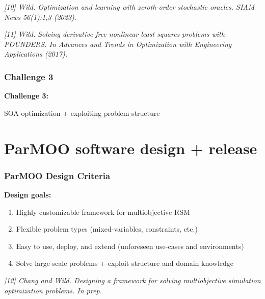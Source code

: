 \documentclass[aspectratio=169]{beamer}
\begin{document}
\begin{frame}
\medskip

{\tiny\it
[10] Wild. Optimization and learning with zeroth-order stochastic oracles.
{\sl SIAM News 56(1):1,3 (2023).}\\
}

\medskip

{\tiny\it
[11] Wild.
Solving derivative-free nonlinear least squares problems with POUNDERS.
{\sl In Advances and Trends in Optimization with Engineering Applications
(2017).}\\
}
\end{frame}

\begin{frame}\frametitle{Challenge 3}
\vfill
\begin{center}
{\Huge \bf
Challenge 3:\\

\bigskip

SOA optimization + exploiting problem structure
}
\end{center}
\vfill
\end{frame}

\section{ParMOO software design + release}

\begin{frame}\frametitle{ParMOO Design Criteria}

{\large
\textbf{Design goals:}}

\medskip

\begin{enumerate}
\item Highly customizable framework for multiobjective RSM
\item Flexible problem types (mixed-variables, constraints, etc.)
\item Easy to use, deploy, and extend (unforeseen use-cases and environments)
\item Solve large-scale problems + exploit structure and domain knowledge
\end{enumerate}

\vfill

{\tiny\it
[12]
Chang and Wild.
Designing a framework for solving multiobjective simulation optimization problems.
In prep.
}
\end{frame}
\end{document}
